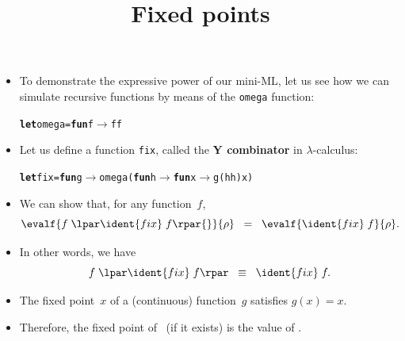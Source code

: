 \documentclass[wide]{slides}
\begin{document}
\begin{slide}
  \title{Fixed points}

  \begin{itemize}

    \item To demonstrate the expressive power of our mini-ML, let us
      see how we can simulate recursive functions by means of the
      \texttt{omega} function:
      \smallskip
\begin{alltt}
\textbf{let} omega = \textbf{fun} f \(\rightarrow\) f f
\end{alltt}

    \item Let us define a function \texttt{fix}, called the \textbf{Y
      combinator} in \(\lambda\)-calculus:
      \smallskip
\begin{alltt}
\textbf{let} fix = \textbf{fun} g \(\rightarrow\) omega (\textbf{fun} h \(\rightarrow\) \textbf{fun} x \(\rightarrow\) g (h h) x)
\end{alltt}

      \item We can show that, for any function~\(f\),
        \begin{equation*}
          \evalf{f \; \lpar\ident{fix} \; f\rpar{}}{\rho} \;\; = \;\;
          \evalf{\ident{fix} \; f}{\rho}.
        \end{equation*}

      \item In other words, we have
        \begin{equation*}
          f \; \lpar\ident{fix} \; f\rpar
          \;\; \equiv \;\; \ident{fix} \; f.
        \end{equation*}

      \item The fixed point~\(x\) of a (continuous) function~\(g\)
        satisfies \(g(x) = x\).

      \item Therefore, the fixed point of~ (if it exists) is
        the value of \lpar{} \rpar{}.

  \end{itemize}

\end{slide}
\end{document}
